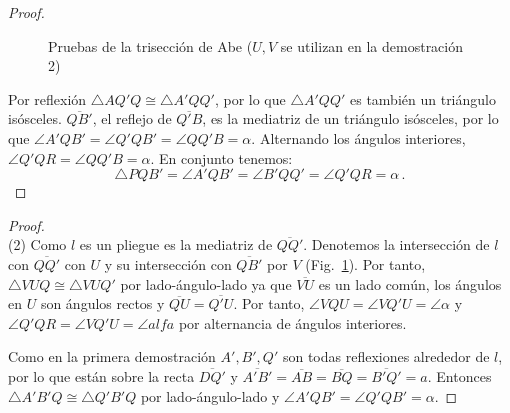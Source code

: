 \begin{proof}
\begin{figure}[ht]
\begin{center}
\end{center}
\caption{Pruebas de la trisección de Abe ($U,V$ se utilizan en la demostración 2)}\label{f.abe2}
\end{figure}

Por reflexión $\triangle AQ'Q\cong \triangle A'QQ'$, por lo que $\triangle A'QQ'$ es también un triángulo isósceles.
$\overline{QB'}$, el reflejo de $\overline{Q'B}$, es la mediatriz de un triángulo isósceles, por lo que $\angle A'QB'=\angle Q'QB'=\angle QQ'B=\alpha$.
Alternando los ángulos interiores, $\angle Q'QR=\angle QQ'B=\alpha$.
En conjunto tenemos:
\[
\triangle PQB'=\angle A'QB'=\angle B'QQ'=\angle Q'QR=\alpha\,.
\]
\end{proof}

\begin{proof}
\mbox{}\\
(2)
Como $l$ es un pliegue es la mediatriz de $\overline{QQ'}$. Denotemos la intersección de $l$ con $\overline{QQ'}$ con $U$ y su intersección con $\overline{QB'}$ por $V$ (Fig.~\ref{f.abe2}). Por tanto, $\triangle VUQ\cong \triangle VUQ'$ por lado-ángulo-lado ya que $\overline{VU}$ es un lado común, los ángulos en $U$ son ángulos rectos y $\overline{QU}=\overline{Q'U}$. Por tanto, $\angle VQU=\angle VQ'U=\angle \alpha$ y $\angle Q'QR=\angle VQ'U=\angle alfa$ por alternancia de ángulos interiores.

Como en la primera demostración $A', B', Q'$ son todas reflexiones alrededor de $l$, por lo que están sobre la recta $\overline{DQ'}$ y $\overline{A'B'}=\overline{AB}=\overline{BQ}=\overline{B'Q'}=a$. Entonces $\triangle A'B'Q\cong\triangle Q'B'Q$ por lado-ángulo-lado y $\angle A'QB'=\angle Q'QB'=\alpha$.
\end{proof}

